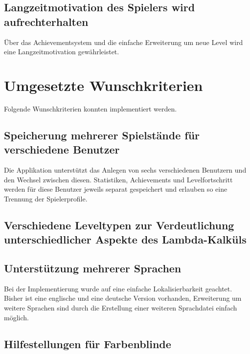 \subsection{Langzeitmotivation des Spielers wird aufrechterhalten}

Über das Achievementsystem und die einfache Erweiterung um neue Level wird eine Langzeitmotivation gewährleistet.


\section{Umgesetzte Wunschkriterien}

Folgende Wunschkriterien konnten implementiert werden.

\subsection{Speicherung mehrerer Spielstände für verschiedene Benutzer}

Die Applikation unterstützt das Anlegen von sechs verschiedenen Benutzern und den Wechsel zwischen diesen.
Statistiken, Achievements und Levelfortschritt werden für diese Benutzer jeweils separat gespeichert und erlauben so eine Trennung der Spielerprofile.

\subsection{Verschiedene Leveltypen zur Verdeutlichung unterschiedlicher Aspekte des Lambda-Kalküls}


\subsection{Unterstützung mehrerer Sprachen}

Bei der Implementierung wurde auf eine einfache Lokalisierbarkeit geachtet.
Bisher ist eine englische und eine deutsche Version vorhanden, Erweiterung um weitere Sprachen sind durch die Erstellung einer weiteren Sprachdatei einfach möglich.

\subsection{Hilfestellungen für Farbenblinde}

